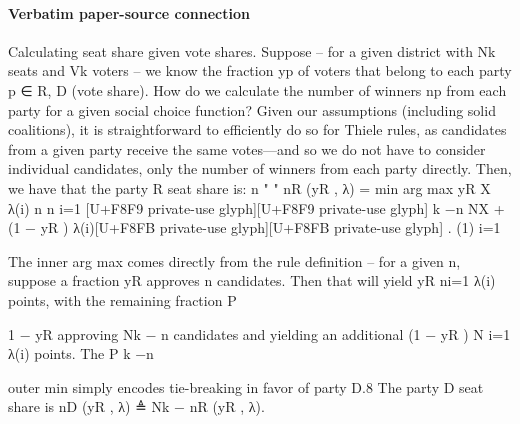 \documentclass[10pt]{article}
\begin{document}
\paragraph{Verbatim paper-source connection}
\begin{ReviewVerbatim}
Calculating seat share given vote shares. Suppose – for a given district with Nk seats and
Vk voters – we know the fraction yp of voters that belong to each party p ∈ {R, D} (vote share).
How do we calculate the number of winners np from each party for a given social choice function?
   Given our assumptions (including solid coalitions), it is straightforward to efficiently do so for
Thiele rules, as candidates from a given party receive the same votes—and so we do not have to
consider individual candidates, only the number of winners from each party directly. Then, we have
that the party R seat share is:
                                                                             n
                                                         "           "
                                    nR (yR , λ) = min arg max yR
                                                                             X
                                                                                   λ(i)
                                                     n           n
                                                                             i=1
                                                                                   [U+F8F9 private-use glyph][U+F8F9 private-use glyph]
                                                                      k −n
                                                                     NX
                                                      +(1 − yR )             λ(i)[U+F8FB private-use glyph][U+F8FB private-use glyph] .                               (1)
                                                                      i=1

    The inner arg max comes directly from the rule definition – for a given n, suppose a fraction
yR approves n candidates. Then that will yield yR ni=1 λ(i) points, with the remaining fraction
                                                      P

1 − yR approving Nk − n candidates and yielding an additional (1 − yR ) N     i=1 λ(i) points. The
                                                                           P k −n

outer min simply encodes tie-breaking in favor of party D.8 The party D seat share is nD (yR , λ) ≜
Nk − nR (yR , λ).
\end{ReviewVerbatim}
\end{document}
